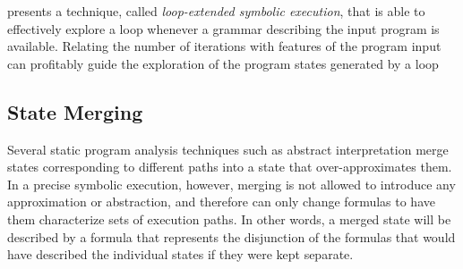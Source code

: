  presents a technique, called {\em loop-extended symbolic execution}, that is able to effectively explore a loop whenever a grammar describing the input program is available. Relating the number of iterations with features of the program input can profitably guide the exploration of the program states generated by a loop



\subsection{State Merging}

Several static program analysis techniques such as abstract interpretation merge states corresponding to different paths into a state that over-approximates them. In a precise symbolic execution, however, merging is not allowed to introduce any approximation or abstraction, and therefore can only change formulas to have them characterize sets of execution paths. In other words, a merged state will be described by a formula that represents the disjunction of the formulas that would have described the individual states if they were kept separate.

